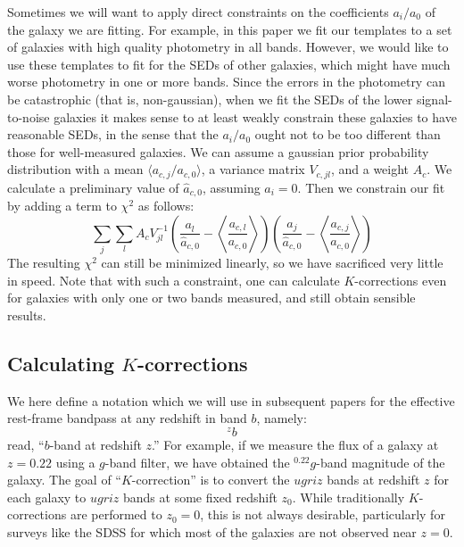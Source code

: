 \documentclass[10pt,preprint]{aastex}
\newcommand{\avg}[1]{{\langle{#1}\rangle}}
\newcommand{\Avg}[1]{{\left\langle{#1}\right\rangle}}
\newcommand{\band}[2]{\ensuremath{^{#1}\!{#2}}}
\begin{document}
Sometimes we will want to apply direct constraints on the coefficients
$a_i/a_0$ of the galaxy we are fitting. For example, in this paper we
fit our templates to a set of galaxies with high quality photometry in
all bands. However, we would like to use these templates to fit for
the SEDs of other galaxies, which might have much worse photometry in
one or more bands. Since the errors in the photometry can be
catastrophic (that is, non-gaussian), when we fit the SEDs of the
lower signal-to-noise galaxies it makes sense to at least weakly
constrain these galaxies to have reasonable SEDs, in the sense that
the $a_i/a_0$ ought not to be too different than those for
well-measured galaxies. We can assume a gaussian prior probability
distribution with a mean $\avg{a_{c,j}/a_{c,0}}$, a variance matrix
$V_{c,jl}$, and a weight $A_c$.  We calculate a preliminary value of
${\hat{a}}_{c,0}$, assuming $a_i = 0$. Then we constrain our fit by
adding a term to $\chi^2$ as follows:
\begin{equation}
\sum_j \sum_l A_c V^{-1}_{jl}
\left(\frac{a_l}{{\hat{a}}_{c,0}}-\Avg{\frac{a_{c,l}}{a_{c,0}}}\right)
\left(\frac{a_j}{{\hat{a}}_{c,0}}-\Avg{\frac{a_{c,j}}{a_{c,0}}}\right)
\end{equation}
The resulting $\chi^2$ can still be minimized linearly, so we have
sacrificed very little in speed.  Note that with such a constraint,
one can calculate $K$-corrections even for galaxies with only one or
two bands measured, and still obtain sensible results. 

\subsection{Calculating $K$-corrections}

We here define a notation which we will use in subsequent papers for
the effective rest-frame bandpass at any redshift in band $b$, namely:
\begin{equation}
\band{z}{b}
\end{equation}
read, ``$b$-band at redshift $z$.'' For example, if we measure the
flux of a galaxy at $z=0.22$ using a $g$-band filter, we have obtained
the $\band{0.22}{g}$-band magnitude of the galaxy. The goal of
``$K$-correction'' is to convert the $ugriz$ bands at redshift $z$
for each galaxy to $ugriz$ bands at some fixed redshift $z_0$. While
traditionally $K$-corrections are performed to $z_0=0$, this is not
always desirable, particularly for surveys like the SDSS for which
most of the galaxies are not observed near $z=0$.
\end{document}
